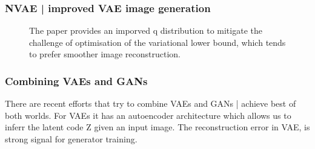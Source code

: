 \documentclass[11pt]{article}
\begin{document}
\subsubsection{NVAE | improved VAE image generation}

\begin{figure}[H]
    \centering
    \caption*{The paper provides an imporved q distribution to mitigate the challenge of optimisation of the variational lower bound, which tends to prefer smoother image reconstruction.}
\end{figure}

\subsubsection{Combining VAEs and GANs}

\begin{figure}[H]
    \centering
\end{figure}

There are recent efforts that try to combine VAEs and GANs | achieve best of both worlds. For VAEs it has an autoencoder architecture which allows us to inferr the latent code Z given an input image. The reconstruction error in VAE, is strong signal for generator training.
\end{document}
